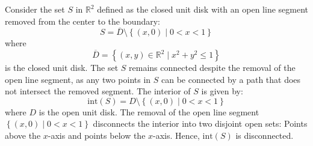 \documentclass[12pt]{article}
\begin{document}
\begin{exercise}{20}
Consider the set \( S \) in \( \mathbb{R}^2 \) defined as the closed unit disk with an open line segment removed from the center to the boundary:
\[
S = \overline{D} \setminus \left\{ (x, 0) \mid 0 < x < 1 \right\}
\]
where 
\[
\overline{D} = \left\{ (x, y) \in \mathbb{R}^2 \mid x^2 + y^2 \leq 1 \right\}
\]
is the closed unit disk.
The set \( S \) remains connected despite the removal of the open line segment, as any two points in \( S \) can be connected by a path that does not intersect the removed segment. The interior of \( S \) is given by:
    \[
    \text{int}(S) = D \setminus \left\{ (x, 0) \mid 0 < x < 1 \right\}
    \]
    where \( D \) is the open unit disk. The removal of the open line segment \( \left\{ (x, 0) \mid 0 < x < 1 \right\} \) disconnects the interior into two disjoint open sets: Points above the \( x \)-axis and points below the \( x \)-axis. Hence, \( \text{int}(S) \) is disconnected.
\end{exercise}
\end{document}
